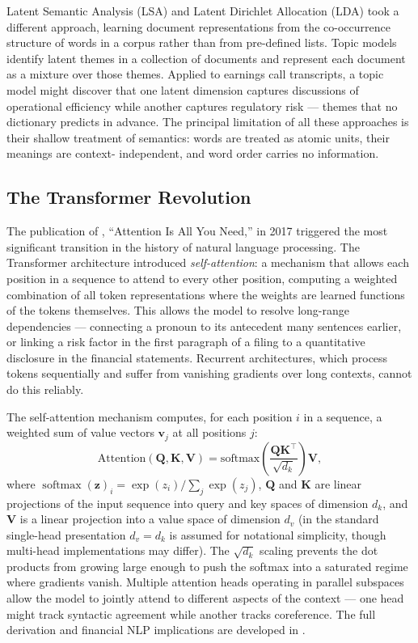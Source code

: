 Latent Semantic Analysis (LSA) and Latent Dirichlet Allocation (LDA)
took a different approach, learning document representations from the
co-occurrence structure of words in a corpus rather than from pre-defined
lists.  Topic models identify latent themes in a collection of documents
and represent each document as a mixture over those themes.  Applied to
earnings call transcripts, a topic model might discover that one latent
dimension captures discussions of operational efficiency while another
captures regulatory risk --- themes that no dictionary predicts in advance.
The principal limitation of all these approaches is their shallow treatment
of semantics: words are treated as atomic units, their meanings are context-
independent, and word order carries no information.

\subsection{The Transformer Revolution}
\label{subsec:transformer-revolution}

The publication of \textcite{vaswani2017attention}, ``Attention Is All
You Need,'' in 2017 triggered the most significant transition in the
history of natural language processing.  The Transformer architecture
introduced \emph{self-attention}: a mechanism that allows each position
in a sequence to attend to every other position, computing a weighted
combination of all token representations where the weights are learned
functions of the tokens themselves.  This allows the model to resolve long-range dependencies --- connecting a
pronoun to its antecedent many sentences earlier, or linking a risk factor
in the first paragraph of a filing to a quantitative disclosure in the
financial statements.  Recurrent architectures, which process tokens
sequentially and suffer from vanishing gradients over long contexts,
cannot do this reliably.

\begin{deepdive}
The self-attention mechanism computes, for each position $i$ in a sequence,
a weighted sum of value vectors $\mathbf{v}_j$ at all positions $j$:
\[
  \mathrm{Attention}(\mathbf{Q}, \mathbf{K}, \mathbf{V})
  = \mathrm{softmax}\!\left(\frac{\mathbf{Q}\mathbf{K}^\top}{\sqrt{d_k}}\right)\mathbf{V},
\]
where $\operatorname{softmax}(\mathbf{z})_i = \exp(z_i)/\sum_j\exp(z_j)$,
$\mathbf{Q}$ and $\mathbf{K}$ are linear projections of the input
sequence into query and key spaces of dimension $d_k$, and $\mathbf{V}$
is a linear projection into a value space of dimension $d_v$ (in the
standard single-head presentation $d_v = d_k$ is assumed for notational
simplicity, though multi-head implementations may differ).
The $\sqrt{d_k}$ scaling prevents the dot products from growing large
enough to push the softmax into a saturated regime where gradients
vanish.  Multiple attention heads operating in parallel subspaces allow
the model to jointly attend to different aspects of the context --- one
head might track syntactic agreement while another tracks coreference.
The full derivation and financial NLP implications are developed in
.
\end{deepdive}

